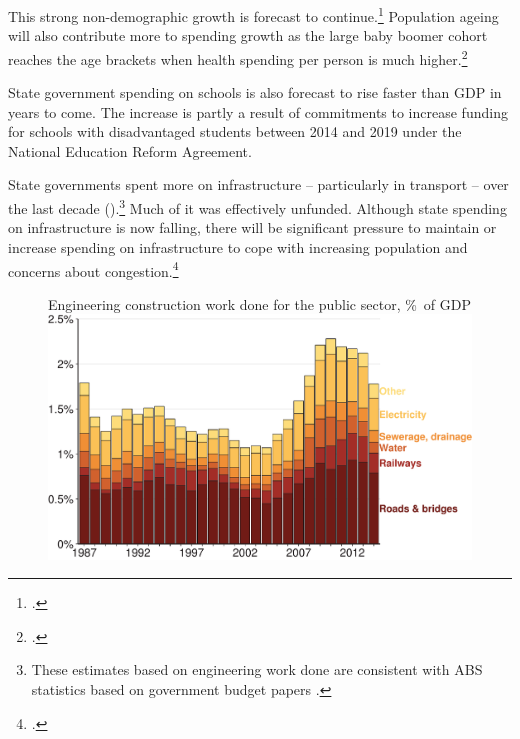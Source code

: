 \documentclass[twoside,english]{Dianab5ona4portrait}
\begin{document}
This strong non-demographic growth is forecast to continue.\footcite{ProductivityCommission2013AgeingAustralia}  Population ageing will also contribute more to spending growth as the large baby boomer cohort reaches the age brackets when health spending per person is much higher.\footcite[][26]{DaleyWoodWeidmannEtAl2014}  

State government spending on schools is also forecast to rise faster than GDP in years to come. The increase is partly a result of commitments to increase funding for schools with disadvantaged students between 2014 and 2019 under the National Education Reform Agreement.  

State governments spent more on infrastructure – particularly in transport – over the last decade ().\footnote{These estimates based on engineering work done are consistent with ABS statistics based on government budget papers \textcite[][41]{PBO2015a}.}  Much of it was effectively unfunded. Although state spending on infrastructure is now falling, there will be significant pressure to maintain or increase spending on infrastructure to cope with increasing population and concerns about congestion.\footcites[][112-128]{KellyDonegan2015}{InfrastructureAustralia2015-InfrastructureAudit}

\begin{figure}
%
{Engineering construction work done for the public sector, \%\ of GDP}
\includegraphics[width=1.1\columnwidth]{Fiscal-challenges/figure/Figure14-1.pdf}

\end{figure}
\end{document}
